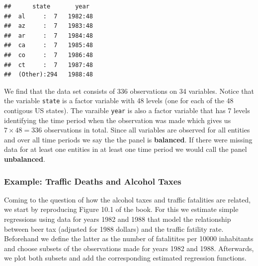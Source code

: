 \documentclass[]{book}
\newenvironment{Shaded}{\begin{snugshade}}{\end{snugshade}}
\newcommand{\KeywordTok}[1]{\textcolor[rgb]{0.13,0.29,0.53}{\textbf{#1}}}
\newcommand{\DecValTok}[1]{\textcolor[rgb]{0.00,0.00,0.81}{#1}}
\newcommand{\StringTok}[1]{\textcolor[rgb]{0.31,0.60,0.02}{#1}}
\newcommand{\CommentTok}[1]{\textcolor[rgb]{0.56,0.35,0.01}{\textit{#1}}}
\newcommand{\OperatorTok}[1]{\textcolor[rgb]{0.81,0.36,0.00}{\textbf{#1}}}
\newcommand{\NormalTok}[1]{#1}
\theoremstyle{definition}
\theoremstyle{definition}
\theoremstyle{definition}
\theoremstyle{remark}
\begin{document}
\begin{verbatim}
##      state       year   
##  al     :  7   1982:48  
##  az     :  7   1983:48  
##  ar     :  7   1984:48  
##  ca     :  7   1985:48  
##  co     :  7   1986:48  
##  ct     :  7   1987:48  
##  (Other):294   1988:48
\end{verbatim}

We find that the data set consists of 336 observations on 34 variables.
Notice that the variable \texttt{state} is a factor variable with 48
levels (one for each of the 48 contigous US states). The varaible
\texttt{year} is also a factor variable that has 7 levels identifying
the time period when the observation was made which gives us
\(7\times48 = 336\) observations in total. Since all variables are
observed for all entities and over all time periods we say the the panel
is \textbf{balanced}. If there were missing data for at least one
entities in at least one time period we would call the panel
\textbf{unbalanced}.

\subsubsection*{Example: Traffic Deaths and Alcohol
Taxes}\label{example-traffic-deaths-and-alcohol-taxes}

Coming to the question of how the alcohol taxes and traffic fatalities
are related, we start by reproducing Figure 10.1 of the book. For this
we estimate simple regressions using data for years 1982 and 1988 that
model the relationship between beer tax (adjusted for 1988 dollars) and
the traffic fatility rate. Beforehand we define the latter as the number
of fatalitites per 10000 inhabitants and choose subsets of the
observations made for years 1982 and 1988. Afterwards, we plot both
subsets and add the corresponding estimated regression functions.

\begin{Shaded}
\end{Shaded}
\end{document}
